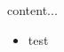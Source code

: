 \documentclass[xcolor={usenames, dvipsnames}]{beamer}
\begin{document}
\begin{frame}
content...

\begin{itemize}
\item test
\end{itemize}
\end{frame}
\end{document}
